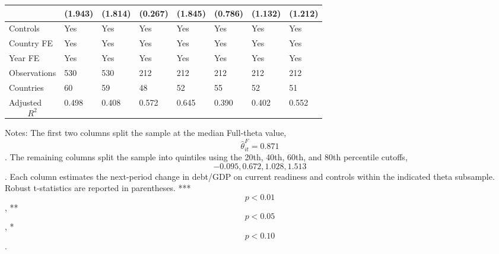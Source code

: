 \begin{table}[H]
\begin{threeparttable}
\begin{tabularx}{\textwidth}{lYYYYYYY}
  & (1.943) & (1.814) & (0.267) & (1.845) & (0.786) & (1.132) & (1.212) \\
\midrule
Controls & Yes & Yes & Yes & Yes & Yes & Yes & Yes \\
Country FE & Yes & Yes & Yes & Yes & Yes & Yes & Yes \\
Year FE & Yes & Yes & Yes & Yes & Yes & Yes & Yes \\
Observations & 530 & 530 & 212 & 212 & 212 & 212 & 212 \\
Countries & 60 & 59 & 48 & 52 & 55 & 52 & 51 \\
Adjusted $$R^2$$ & 0.498 & 0.408 & 0.572 & 0.645 & 0.390 & 0.402 & 0.552 \\
\bottomrule
\end{tabularx}
\begin{tablenotes}[flushleft]\footnotesize
\item Notes: The first two columns split the sample at the median Full-theta value, $$\widehat{\theta}^{F}_{it}=0.871$$. The remaining columns split the sample into quintiles using the 20th, 40th, 60th, and 80th percentile cutoffs, $$-0.095, 0.672, 1.028, 1.513$$. Each column estimates the next-period change in debt/GDP on current readiness and controls within the indicated theta subsample. Robust t-statistics are reported in parentheses. *** $$p<0.01$$, ** $$p<0.05$$, * $$p<0.10$$.
\end{tablenotes}
\end{threeparttable}
\end{table}
